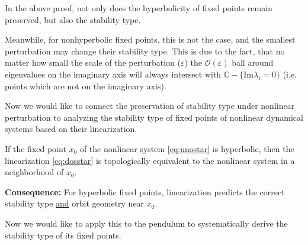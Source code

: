 \begin{remark}[]
	In the above proof, not only does the hyperbolicity of fixed points remain preserved, but also the stability type.
\end{remark}
Meanwhile, for nonhyperbolic fixed points, this is not the case, and the smallest perturbation may change their stability type. This is due to the fact, that no matter how small the scale of the perturbation ($\varepsilon$) the $\mathcal{O}(\varepsilon)$ ball around eigenvalues on the imaginary axis will always intersect with $\mathbb{C}- \{  \textrm{Im}\lambda_i =0 \}$ (i.e. points which are not on the imaginary axis).

Now we would like to connect the preservation of stability type under nonlinear perturbation to analyzing the stability type of fixed points of nonlinear dynamical systems based on their linearization. 
\begin{theorem}
	If the fixed point ${x_0} $ of the nonlinear system \eqref{eq:unostar} is hyperbolic, then the linearization \eqref{eq:dosstar} is topologically equivalent to the nonlinear system in a neighborhood of ${x_0} $. 

	\textbf{Consequence:} For hyperbolic fixed points, linearization predicts the correct stability type \underline{and} orbit geometry near ${x_0} $. 
\end{theorem}
Now we would like to apply this to the pendulum to systematically derive the stability type of its fixed points.
